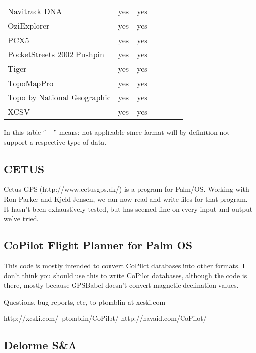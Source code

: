 \documentclass[12pt]{article}
\begin{document}
\begin{tabular}{|l|cc|cc|cc|}
Navitrack DNA						& yes		& yes		&				&				&				& 			\\
OziExplorer							& yes		& yes		&				&				&				& 			\\
PCX5										& yes		& yes		&				&				&				& 			\\
PocketStreets 2002 Pushpin
      									& yes		& yes		&				&				&				& 			\\
Tiger										& yes		& yes		&				&				&				& 			\\
TopoMapPro							& yes		& yes		&				&				&				& 			\\
Topo by National Geographic
      									& yes		& yes		&				&				&				& 			\\
XCSV										& yes		& yes		&				&				&				& 			\\
\hline
\end{tabular}

In this table ``---'' means: not applicable since format will by definition not 
support a respective type of data.


\subsection{CETUS}

	Cetus GPS (http://www.cetusgps.dk/) is a program for Palm/OS.  
	Working with Ron Parker and Kjeld Jensen, we can now read and write
	files for that program.   It hasn't been exhaustively tested, but 
	has seemed fine on every input and output we've tried.



\subsection{CoPilot Flight Planner for Palm OS}

        This code is mostly intended to convert CoPilot databases into
        other formats.  I don't think you should use this to write
        CoPilot databases, although the code is there, mostly because
        GPSBabel doesn't convert magnetic declination values.

        Questions, bug reports, etc, to ptomblin at xcski.com


	http://xcski.com/~ptomblin/CoPilot/
	http://navaid.com/CoPilot/



\subsection{Delorme S\&A}
\end{document}
